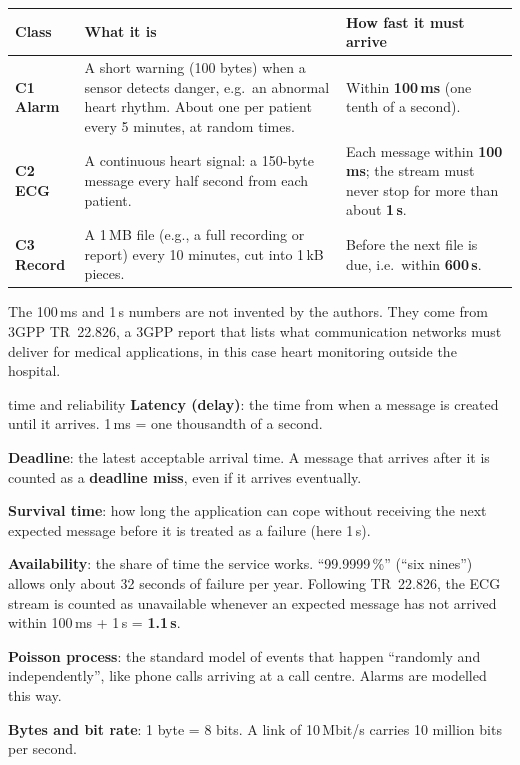 \documentclass[11pt,a4paper]{article}
\newcommand{\kt}[1]{\textbf{\color{navy}#1}}
\begin{document}
\begin{center}
\small
\begin{tabularx}{0.96\linewidth}{@{}>{\bfseries}l X X@{}}
\toprule
Class & What it is & How fast it must arrive \\
\midrule
C1 Alarm & A short warning (100 bytes) when a sensor detects danger, e.g.\ an abnormal heart rhythm. About one per patient every 5 minutes, at random times. & Within \textbf{100\,ms} (one tenth of a second). \\
C2 ECG & A continuous heart signal: a 150-byte message every half second from each patient. & Each message within \textbf{100\,ms}; the stream must never stop for more than about \textbf{1\,s}. \\
C3 Record & A 1\,MB file (e.g., a full recording or report) every 10 minutes, cut into 1\,kB pieces. & Before the next file is due, i.e.\ within \textbf{600\,s}. \\
\bottomrule
\end{tabularx}
\end{center}

The 100\,ms and 1\,s numbers are not invented by the authors. They come from 3GPP TR~22.826, a 3GPP report that lists what communication networks must deliver for medical applications, in this case heart monitoring outside the hospital.

\begin{term}{time and reliability}
\kt{Latency (delay)}: the time from when a message is created until it arrives. 1\,ms = one thousandth of a second.\par
\kt{Deadline}: the latest acceptable arrival time. A message that arrives after it is counted as a \kt{deadline miss}, even if it arrives eventually.\par
\kt{Survival time}: how long the application can cope without receiving the next expected message before it is treated as a failure (here 1\,s).\par
\kt{Availability}: the share of time the service works. ``99.9999\,\%'' (``six nines'') allows only about 32 seconds of failure per year. Following TR~22.826, the ECG stream is counted as unavailable whenever an expected message has not arrived within 100\,ms + 1\,s = \textbf{1.1\,s}.\par
\kt{Poisson process}: the standard model of events that happen ``randomly and independently'', like phone calls arriving at a call centre. Alarms are modelled this way.\par
\kt{Bytes and bit rate}: 1 byte = 8 bits. A link of 10\,Mbit/s carries 10 million bits per second.
\end{term}
\end{document}
